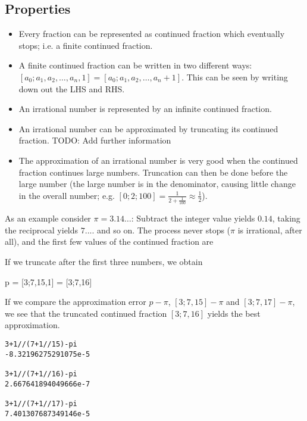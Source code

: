 \subsection{Properties}

\begin{itemize}

	\item Every fraction can be represented as continued fraction which eventually stops; i.e. a finite continued fraction.

	\item A finite continued fraction can be written in two different ways: $[a_0;a_1, a_2, \ldots, a_n, 1] = [a_0;a_1, a_2, \ldots, a_n+1]$. This can be seen by writing down out the LHS and RHS.

	\item An irrational number is represented by an infinite continued fraction.

	\item An irrational number can be approximated by truncating its continued fraction. TODO: Add further information
	
	\item The approximation of an irrational number is very good when the continued fraction continues large numbers. Truncation can then be done before the large 
	number (the large number is in the denominator, causing little change in the overall number; e.g. $[0;2;100] = \frac{1}{2 + \frac{1}{100}} \approx \frac{1}{2}$).

\end{itemize}


As an example consider $\pi = 3.14 \ldots$: Subtract the integer value yields $0.14$, taking the reciprocal yields $7....$ and so on. The process never stops ($\pi$ is irrational, after all), and the first few values of the continued fraction are

\bee
\pi \approx [3;7,15,1,292,\ldots]
\eee

If we truncate after the first three numbers, we obtain

\bee
p = [3;7,15,1] = [3;7,16]
\eee

If we compare the approximation error $p - \pi$, $[3;7,15] - \pi$ and $[3;7,17] - \pi$, we see that the truncated continued fraction $[3;7,16]$ yields the best approximation.


\begin{verbatim}
3+1//(7+1//15)-pi
-8.32196275291075e-5

3+1//(7+1//16)-pi
2.667641894049666e-7

3+1//(7+1//17)-pi
7.401307687349146e-5
\end{verbatim}

